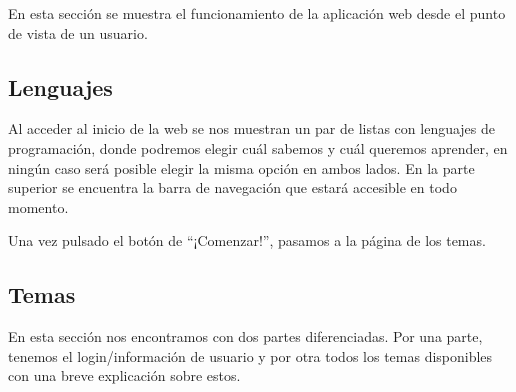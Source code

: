 En esta sección se muestra el funcionamiento de la aplicación web desde el punto de vista de un usuario.

\subsection{Lenguajes}
Al acceder al inicio de la web se nos muestran un par de listas con lenguajes de programación, donde podremos elegir cuál sabemos y cuál queremos aprender, en ningún caso será posible elegir la misma opción en ambos lados. En la parte superior se encuentra la barra de navegación que estará accesible en todo momento.

\begin{figure}[H]
\begin{center}
\end{center}
\end{figure}
Una vez pulsado el botón de ``¡Comenzar!'', pasamos a la página de los temas.
\subsection{Temas}
En esta sección nos encontramos con dos partes diferenciadas. Por una parte, tenemos el login/información de usuario y por otra todos los temas disponibles con una breve explicación sobre estos.

\begin{figure}[H]
\begin{center}
\end{center}
\end{figure}

